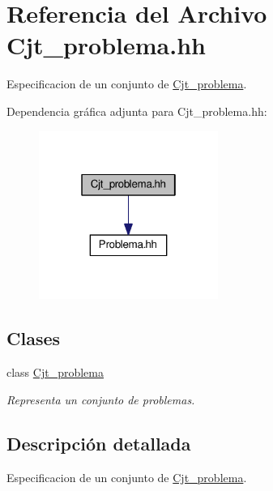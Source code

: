\hypertarget{_cjt__problema_8hh}{}\section{Referencia del Archivo Cjt\+\_\+problema.\+hh}
\label{_cjt__problema_8hh}


Especificacion de un conjunto de \mbox{\hyperlink{class_cjt__problema}{Cjt\+\_\+problema}}.  


Dependencia gráfica adjunta para Cjt\+\_\+problema.\+hh\+:
\nopagebreak
\begin{figure}[H]
\begin{center}
\leavevmode
\includegraphics[width=166pt]{_cjt__problema_8hh__incl}
\end{center}
\end{figure}
\subsection*{Clases}
\begin{DoxyCompactItemize}
\item 
class \mbox{\hyperlink{class_cjt__problema}{Cjt\+\_\+problema}}
\begin{DoxyCompactList}\small\item\em Representa un conjunto de problemas. \end{DoxyCompactList}\end{DoxyCompactItemize}


\subsection{Descripción detallada}
Especificacion de un conjunto de \mbox{\hyperlink{class_cjt__problema}{Cjt\+\_\+problema}}. 

